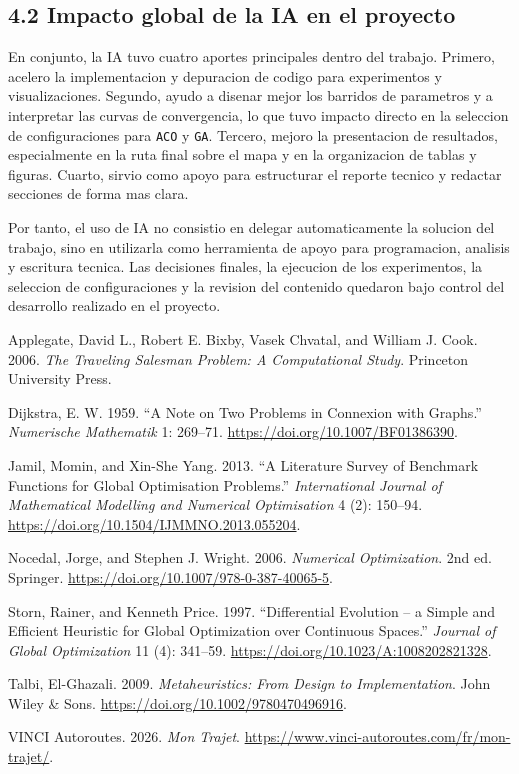 \documentclass[
  12pt,
  letterpaper,
  DIV=11,
  numbers=noendperiod]{scrartcl}
\newlength{\cslhangindent}
\newenvironment{CSLReferences}[2] %
 {\begin{list}{}{%
  \setlength{\itemindent}{0pt}
  \setlength{\leftmargin}{0pt}
  \setlength{\parsep}{0pt}
  \ifodd #1
   \setlength{\leftmargin}{\cslhangindent}
   \setlength{\itemindent}{-1\cslhangindent}
  \fi
  \setlength{\itemsep}{#2\baselineskip}}}
 {\end{list}}
\begin{document}
\subsection{4.2 Impacto global de la IA en el
proyecto}\label{impacto-global-de-la-ia-en-el-proyecto}

En conjunto, la IA tuvo cuatro aportes principales dentro del trabajo.
Primero, acelero la implementacion y depuracion de codigo para
experimentos y visualizaciones. Segundo, ayudo a disenar mejor los
barridos de parametros y a interpretar las curvas de convergencia, lo
que tuvo impacto directo en la seleccion de configuraciones para
\texttt{ACO} y \texttt{GA}. Tercero, mejoro la presentacion de
resultados, especialmente en la ruta final sobre el mapa y en la
organizacion de tablas y figuras. Cuarto, sirvio como apoyo para
estructurar el reporte tecnico y redactar secciones de forma mas clara.

Por tanto, el uso de IA no consistio en delegar automaticamente la
solucion del trabajo, sino en utilizarla como herramienta de apoyo para
programacion, analisis y escritura tecnica. Las decisiones finales, la
ejecucion de los experimentos, la seleccion de configuraciones y la
revision del contenido quedaron bajo control del desarrollo realizado en
el proyecto.

\protect{}\label{refs}
\begin{CSLReferences}{1}{1}
Applegate, David L., Robert E. Bixby, Vasek Chvatal, and William J.
Cook. 2006. \emph{The Traveling Salesman Problem: A Computational
Study}. Princeton University Press.

Dijkstra, E. W. 1959. {``A Note on Two Problems in Connexion with
Graphs.''} \emph{Numerische Mathematik} 1: 269--71.
\url{https://doi.org/10.1007/BF01386390}.

Jamil, Momin, and Xin-She Yang. 2013. {``A Literature Survey of
Benchmark Functions for Global Optimisation Problems.''}
\emph{International Journal of Mathematical Modelling and Numerical
Optimisation} 4 (2): 150--94.
\url{https://doi.org/10.1504/IJMMNO.2013.055204}.

Nocedal, Jorge, and Stephen J. Wright. 2006. \emph{Numerical
Optimization}. 2nd ed. Springer.
\url{https://doi.org/10.1007/978-0-387-40065-5}.

Storn, Rainer, and Kenneth Price. 1997. {``Differential Evolution -- a
Simple and Efficient Heuristic for Global Optimization over Continuous
Spaces.''} \emph{Journal of Global Optimization} 11 (4): 341--59.
\url{https://doi.org/10.1023/A:1008202821328}.

Talbi, El-Ghazali. 2009. \emph{Metaheuristics: From Design to
Implementation}. John Wiley \& Sons.
\url{https://doi.org/10.1002/9780470496916}.

VINCI Autoroutes. 2026. \emph{Mon Trajet}.
\url{https://www.vinci-autoroutes.com/fr/mon-trajet/}.

\end{CSLReferences}
\end{document}
